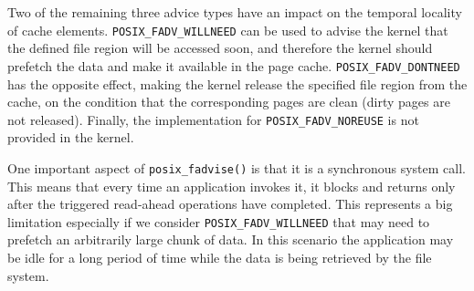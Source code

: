 Two of the remaining three advice types have an impact on the temporal locality of cache elements. \texttt{POSIX\_FADV\_WILLNEED} can be used to advise the kernel that the defined file region will be accessed soon, and therefore the kernel should prefetch the data and make it available in the page cache. \texttt{POSIX\_FADV\_DONTNEED} has the opposite effect, making the kernel release the specified file region from the cache, on the condition that the corresponding pages are clean (dirty pages are not released). Finally, the implementation for \texttt{POSIX\_FADV\_NOREUSE} is not provided in the kernel. %

One important aspect of \texttt{posix\_fadvise()} is that it is a synchronous system call. This means that every time an application invokes it, it blocks and returns only after the triggered read-ahead operations have completed. This represents a big limitation especially if we consider \texttt{POSIX\_FADV\_WILLNEED} that may need to prefetch an arbitrarily large chunk of data. In this scenario the application may be idle for a long period of time while the data is being retrieved by the file system.
